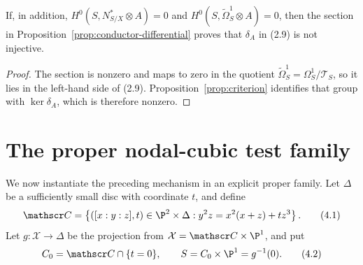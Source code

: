 \begin{corollary}
\label{cor:normal-crossing-kernel}
If, in addition, $H^0(S,N^*_{S/X}\otimes A)=0$ and
$H^0(S,\widetilde\Omega^1_S\otimes A)=0$, then the section in
Proposition~\ref{prop:conductor-differential} proves that $\delta_A$ in
(2.9) is not injective.
\end{corollary}

\begin{proof}
The section is nonzero and maps to zero in the quotient
$\widetilde\Omega^1_S=\Omega^1_S/\mathscr T_S$, so it
lies in the left-hand side of (2.9).  Proposition~\ref{prop:criterion}
identifies that group with $\ker\delta_A$, which is therefore nonzero.
\end{proof}

\section{The proper nodal-cubic test family}

We now instantiate the preceding mechanism in an explicit proper family.
Let $\Delta$ be a sufficiently small disc with coordinate $t$, and define
\[
 \mathscr C=
 \left\{([x:y:z],t)\in\P^2\times\Delta:
 y^2z=x^2(x+z)+tz^3\right\}.
 \tag{4.1}
\]
Let $g:\mathcal X\to\Delta$ be the projection from
$\mathcal X=\mathscr C\times\P^1$, and put
\[
 C_0=\mathscr C\cap\{t=0\},\qquad S=C_0\times\P^1=g^{-1}(0).
 \tag{4.2}
\]

